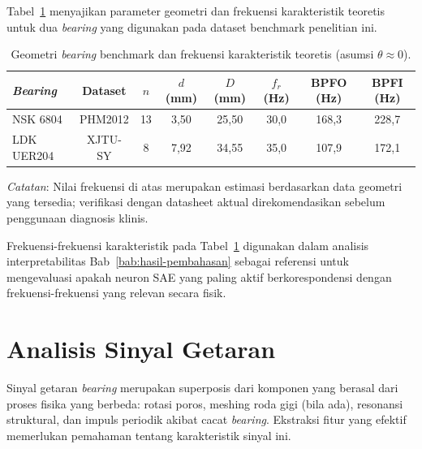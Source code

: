 Tabel~\ref{tab:bab3_geometri_bearing} menyajikan parameter geometri dan
frekuensi karakteristik teoretis untuk dua \emph{bearing} yang digunakan pada
dataset benchmark penelitian ini.

\begin{table}[ht]
  \centering
  \caption{Geometri \emph{bearing} benchmark dan frekuensi karakteristik teoretis
           (asumsi $\theta \approx 0$).}
  \label{tab:bab3_geometri_bearing}
  \small
  \begin{tabular}{@{}lccccccc@{}}
    \toprule
    \emph{Bearing} & Dataset & $n$ & $d$ (mm) & $D$ (mm) & $f_r$ (Hz)
      & BPFO (Hz) & BPFI (Hz) \\
    \midrule
    NSK 6804 & PHM2012 & 13 & 3{,}50 & 25{,}50 & 30{,}0 & 168{,}3 & 228{,}7 \\
    LDK UER204 & XJTU-SY & 8 & 7{,}92 & 34{,}55 & 35{,}0 & 107{,}9 & 172{,}1 \\
    \bottomrule
  \end{tabular}

  \smallskip
  \footnotesize
  \emph{Catatan}: Nilai frekuensi di atas merupakan estimasi berdasarkan data
  geometri yang tersedia; verifikasi dengan datasheet aktual direkomendasikan
  sebelum penggunaan diagnosis klinis.
\end{table}

Frekuensi-frekuensi karakteristik pada Tabel~\ref{tab:bab3_geometri_bearing}
digunakan dalam analisis interpretabilitas Bab~\ref{bab:hasil-pembahasan}
sebagai referensi untuk mengevaluasi apakah neuron SAE yang paling aktif
berkorespondensi dengan frekuensi-frekuensi yang relevan secara fisik.

\section{Analisis Sinyal Getaran}
\label{sec:bab3_analisis_sinyal}

Sinyal getaran \emph{bearing} merupakan superposis dari komponen yang berasal dari
proses fisika yang berbeda: rotasi poros, meshing roda gigi (bila ada), resonansi
struktural, dan impuls periodik akibat cacat \emph{bearing}. Ekstraksi fitur yang
efektif memerlukan pemahaman tentang karakteristik sinyal ini.

